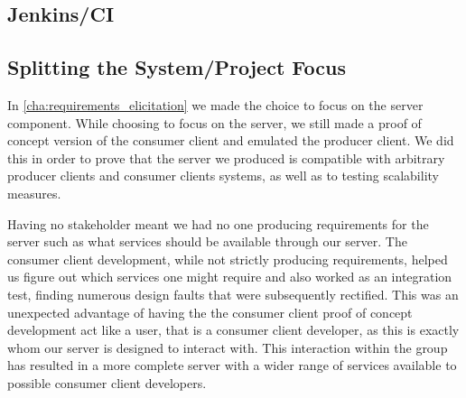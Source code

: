 
\subsection{Jenkins/CI}
\subsection{Splitting the System/Project Focus}
In \cref{cha:requirements_elicitation} we made the choice to focus on the server component.
While choosing to focus on the server, we still made a proof of concept version of the consumer client and emulated the producer client.
We did this in order to prove that the server we produced is compatible with arbitrary producer clients and consumer clients systems, as well as to testing scalability measures.

Having no stakeholder meant we had no one producing requirements for the server such as what services should be available through our server.
The consumer client development, while not strictly producing requirements, helped us figure out which services one might require and also worked as an integration test, finding numerous design faults that were subsequently rectified.
This was an unexpected advantage of having the the consumer client proof of concept development act like a user, that is a consumer client developer, as this is exactly whom our server is designed to interact with.
This interaction within the group has resulted in a more complete server with a wider range of services available to possible consumer client developers.

